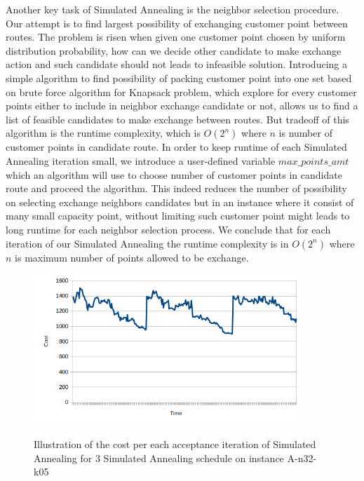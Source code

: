 \documentclass[12pt]{article}
\begin{document}
Another key task of Simulated Annealing is the neighbor selection procedure. Our attempt is to find largest possibility of exchanging customer point between routes. The problem is risen when given one customer point chosen by uniform distribution probability, how can we decide other candidate to make exchange action and such candidate should not leads to infeasible solution. Introducing a simple algorithm to find possibility of packing customer point into one set based on brute force algorithm for Knapsack problem, which explore for every customer points either to include in neighbor exchange candidate or not, allows us to find a list of feasible candidates to make exchange between routes. But tradeoff of this algorithm is the runtime complexity, which is $O(2^n)$ where $n$ is number of customer points in candidate route. In order to keep runtime of each Simulated Annealing iteration small, we introduce a user-defined variable $max\_points\_amt$ which an algorithm will use to choose number of customer points in candidate route and proceed the algorithm. This indeed reduces the number of possibility on selecting exchange neighbors candidates but in an instance where it consist of many small capacity point, without limiting such customer point might leads to long runtime for each neighbor selection process. We conclude that for each iteration of our Simulated Annealing the runtime complexity is in $O(2^n)$ where $n$ is maximum number of points allowed to be exchange.

\begin{figure}[!h]
	\caption{Illustration of the cost per each acceptance iteration of Simulated Annealing for 3 Simulated Annealing schedule on instance A-n32-k05}
	\centering
	\includegraphics[width=0.9\textwidth]{A-n32-k05-sa-cost.png}
	\label{fig:A-n32-k05-sa-cost}
\end{figure}


\end{document}
